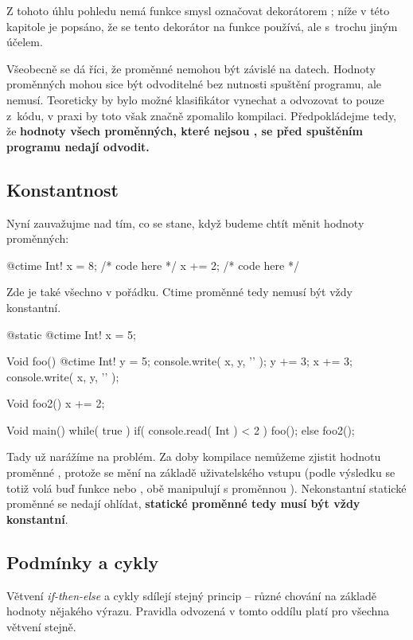 Z tohoto úhlu pohledu nemá funkce smysl označovat dekorátorem ; níže v této kapitole je popsáno, že se tento dekorátor na funkce používá, ale s~trochu jiným účelem.

Všeobecně se dá říci, že \ctime proměnné nemohou být závislé na \nonctime datech. Hodnoty \nonctime proměnných mohou sice být odvoditelné bez nutnosti spuštění programu, ale nemusí. Teoreticky by bylo možné klasifikátor vynechat a odvozovat to pouze z~kódu, v praxi by toto však značně zpomalilo kompilaci. Předpokládejme tedy, že \textbf{hodnoty všech proměnných, které nejsou \ctime, se před spuštěním programu nedají odvodit.}

\subsection{Konstantnost}
Nyní zauvažujme nad tím, co se stane, když budeme chtít měnit hodnoty \ctime proměnných:

\begin{code}
@ctime Int! x = 8;
/* code here */
x += 2;
/* code here */
\end{code}

Zde je také všechno v pořádku. Ctime proměnné tedy nemusí být vždy konstantní.

\begin{code}
@static @ctime Int! x = 5;

Void foo() {
	@ctime Int! y = 5;
	console.write( x, y, '\n' );
	y += 3;
	x += 3;
	console.write( x, y, '\n' );
}

Void foo2() {
	x += 2;
}

Void main() {
	while( true ) {
		if( console.read( Int ) < 2 )
			foo();
		else
			foo2();
	}
}
\end{code}

Tady už narážíme na problém. Za doby kompilace nemůžeme zjistit hodnotu proměnné , protože se mění na základě uživatelského vstupu (podle výsledku  se totiž volá buď funkce  nebo , obě manipulují s proměnnou ). Nekonstantní statické proměnné se nedají ohlídat, \textbf{\ctime statické proměnné tedy musí být vždy konstantní}.

\subsection{Podmínky a cykly}
Větvení \textit{if-then-else} a cykly sdílejí stejný princip -- různé chování na základě hodnoty nějakého výrazu. Pravidla odvozená v tomto oddílu platí pro všechna větvení stejně.

